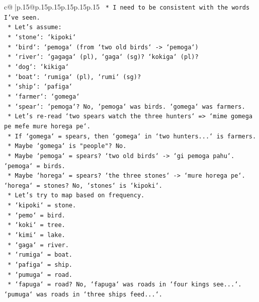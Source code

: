\documentclass{article}
\begin{document}
{\begin{supertabular}{c@{$\;$}|p{.15\linewidth}@{}p{.15\linewidth}p{.15\linewidth}p{.15\linewidth}p{.15\linewidth}p{.15\linewidth}}
{{{\texttt{        *   I need to be consistent with the words I've seen.} \\
\texttt{        *   Let's assume:} \\
\texttt{            *   `stone`: `kipoki`} \\
\texttt{            *   `bird`: `pemoga` (from `two old birds` {-}> `pemoga`)} \\
\texttt{            *   `river`: `gagaga` (pl), `gaga` (sg)? `kokiga` (pl)?} \\
\texttt{            *   `dog`: `kikiga`} \\
\texttt{            *   `boat`: `rumiga` (pl), `rumi` (sg)?} \\
\texttt{            *   `ship`: `pafiga`} \\
\texttt{            *   `farmer`: `gomega`} \\
\texttt{            *   `spear`: `pemoga`? No, `pemoga` was birds. `gomega` was farmers.} \\
\texttt{            *   Let's re{-}read `two spears watch the three hunters` => `mime gomega pe mefe mure horega pe`.} \\
\texttt{            *   If `gomega` = spears, then `gomega` in `two hunters...` is farmers.} \\
\texttt{            *   Maybe `gomega` is "people"? No.} \\
\texttt{            *   Maybe `pemoga` = spears? `two old birds` {-}> `gi pemoga pahu`. `pemoga` = birds.} \\
\texttt{            *   Maybe `horega` = spears? `the three stones` {-}> `mure horega pe`. `horega` = stones? No, `stones` is `kipoki`.} \\
\texttt{            *   Let's try to map based on frequency.} \\
\texttt{            *   `kipoki` = stone.} \\
\texttt{            *   `pemo` = bird.} \\
\texttt{            *   `koki` = tree.} \\
\texttt{            *   `kimi` = lake.} \\
\texttt{            *   `gaga` = river.} \\
\texttt{            *   `rumiga` = boat.} \\
\texttt{            *   `pafiga` = ship.} \\
\texttt{            *   `pumuga` = road.} \\
\texttt{            *   `fapuga` = road? No, `fapuga` was roads in `four kings see...`. `pumuga` was roads in `three ships feed...`.} \\
}}}
\end{supertabular}}
\end{document}
